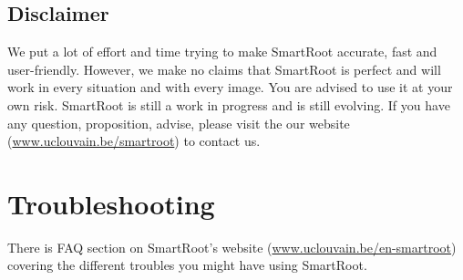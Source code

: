 \documentclass[a4paper,english,10pt]{report}
\begin{document}
{\color{coolSection}\section{Disclaimer}}

We put a lot of effort and time trying to make SmartRoot accurate, fast and user-friendly. However, we make no claims that SmartRoot is perfect and will work in every situation and with every image. You are advised to use it at your own risk. SmartRoot is still a work in progress and is still evolving. If you have any question, proposition, advise, please visit the our website (\url{www.uclouvain.be/smartroot}) to contact us.


\chapter{Troubleshooting}

There is FAQ section on SmartRoot's website (\url{www.uclouvain.be/en-smartroot}) covering the different troubles you might have using SmartRoot.
\end{document}
